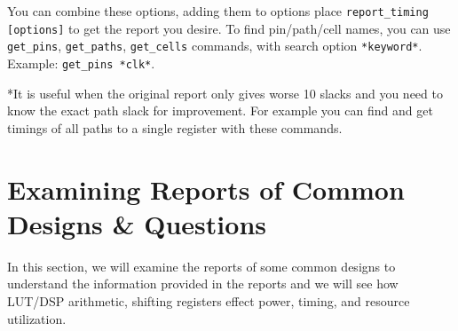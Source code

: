 \documentclass{report}
\begin{document}
You can combine these options, adding them to options place \texttt{report\_timing [options]} to get the report you desire. 
To find pin/path/cell names, you can use \texttt{get\_pins}, \texttt{get\_paths}, \texttt{get\_cells} commands, with search option \texttt{*keyword*}. Example: \texttt{get\_pins *clk*}.

*It is useful when the original report only gives worse 10 slacks and you need to know the exact path slack for improvement. For example you can find and get timings of all paths to a single register with these commands.

\chapter{Examining Reports of Common Designs \& Questions}
In this section, we will examine the reports of some common designs to understand the information provided in the reports and we will see how LUT/DSP arithmetic, shifting registers effect power, timing, and resource utilization.




    
    
\end{document}
